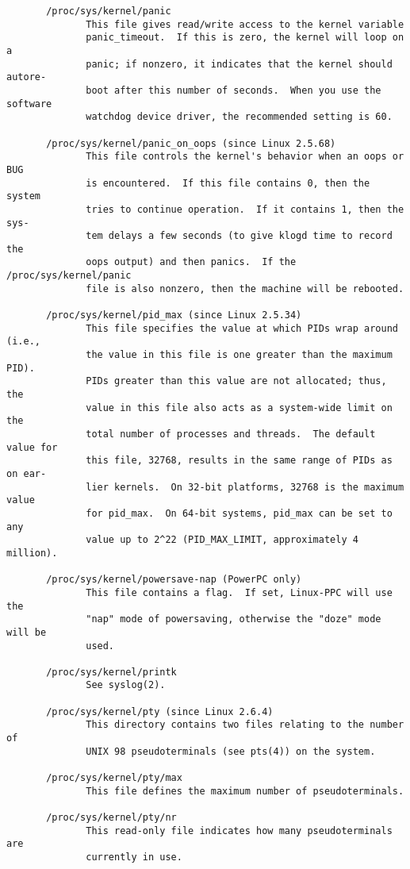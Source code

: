 \documentclass[]{article}
\begin{document}
\begin{verbatim}
       /proc/sys/kernel/panic
              This file gives read/write access to the kernel variable
              panic_timeout.  If this is zero, the kernel will loop on a
              panic; if nonzero, it indicates that the kernel should autore‐
              boot after this number of seconds.  When you use the software
              watchdog device driver, the recommended setting is 60.

       /proc/sys/kernel/panic_on_oops (since Linux 2.5.68)
              This file controls the kernel's behavior when an oops or BUG
              is encountered.  If this file contains 0, then the system
              tries to continue operation.  If it contains 1, then the sys‐
              tem delays a few seconds (to give klogd time to record the
              oops output) and then panics.  If the /proc/sys/kernel/panic
              file is also nonzero, then the machine will be rebooted.

       /proc/sys/kernel/pid_max (since Linux 2.5.34)
              This file specifies the value at which PIDs wrap around (i.e.,
              the value in this file is one greater than the maximum PID).
              PIDs greater than this value are not allocated; thus, the
              value in this file also acts as a system-wide limit on the
              total number of processes and threads.  The default value for
              this file, 32768, results in the same range of PIDs as on ear‐
              lier kernels.  On 32-bit platforms, 32768 is the maximum value
              for pid_max.  On 64-bit systems, pid_max can be set to any
              value up to 2^22 (PID_MAX_LIMIT, approximately 4 million).

       /proc/sys/kernel/powersave-nap (PowerPC only)
              This file contains a flag.  If set, Linux-PPC will use the
              "nap" mode of powersaving, otherwise the "doze" mode will be
              used.

       /proc/sys/kernel/printk
              See syslog(2).

       /proc/sys/kernel/pty (since Linux 2.6.4)
              This directory contains two files relating to the number of
              UNIX 98 pseudoterminals (see pts(4)) on the system.

       /proc/sys/kernel/pty/max
              This file defines the maximum number of pseudoterminals.

       /proc/sys/kernel/pty/nr
              This read-only file indicates how many pseudoterminals are
              currently in use.


\end{verbatim}
\end{document}
